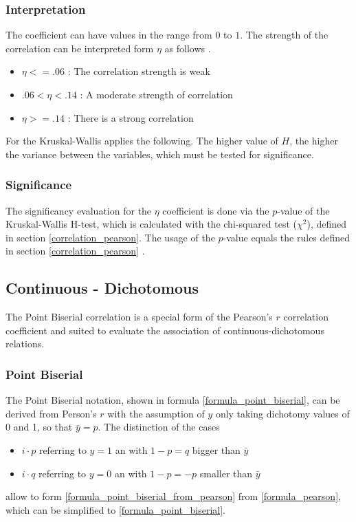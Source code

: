 \documentclass[a4paper,12pt]{report}
\begin{document}
\subsubsection{Interpretation}
The coefficient can have values in the range from $0$ to $1$. The strength of the correlation can be interpreted form $\eta$ as follows \cite{Regber2016}.

\begin{itemize}
	\item $\eta <= .06$ : The correlation strength is weak
	\item $.06 < \eta < .14$ : A moderate strength of correlation
	\item $\eta >= .14$ : There is a strong correlation
\end{itemize}

 For the Kruskal-Wallis applies the following. The higher value of $H$, the higher the variance between the variables, which must be tested for significance.

\subsubsection{Significance}
The significancy evaluation for the $\eta$ coefficient is done via the $p$-value of the Kruskal-Wallis H-test, which is calculated with the chi-squared test ($\chi^2$), defined in section \ref{correlation_pearson}. The usage of the $p$-value equals the rules defined in section \ref{correlation_pearson} \cite{Filipiak2013}. 

\subsection{Continuous - Dichotomous}
The Point Biserial correlation is a special form of the Pearson's $r$ correlation coefficient and suited to evaluate the association of continuous-dichotomous relations. 

\subsubsection{Point Biserial}
The Point Biserial notation, shown in formula \ref{formula_point_biserial}, can be derived from Person's $r$ with the assumption of $y$ only taking dichotomy values of 0 and 1, so that $\bar{y} = p$. The distinction of the cases

\begin{itemize}
	\item $i \cdot p$ referring to $y=1$ an with $1 - p = q$ bigger than $\bar{y}$
	\item $i \cdot q$ referring to $y=0$ an with $1 - p = -p$ smaller than $\bar{y}$
\end{itemize}
allow to form \ref{formula_point_biserial_from_pearson} from \ref{formula_pearson}, which can be simplified to \ref{formula_point_biserial}. \cite{Tate1954,CohenWest2003,Bortz2004,DeJesus2019}
\end{document}
